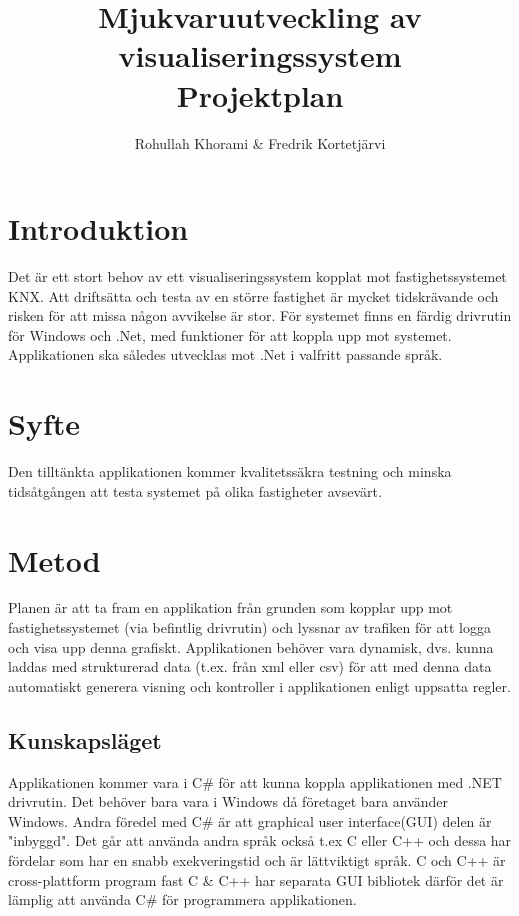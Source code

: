 \documentclass{article}
\title{Mjukvaruutveckling av visualiseringssystem\\
\Large {Projektplan}
}
\author{Rohullah Khorami \& Fredrik Kortetjärvi }
\begin{document}
\maketitle
\newpage
\tableofcontents
\newpage

\section{Introduktion}Det är ett stort behov av ett visualiseringssystem kopplat mot fastighetssystemet KNX. Att driftsätta och testa av
en större fastighet är mycket tidskrävande och risken för att missa någon avvikelse är stor. 
För systemet finns en färdig drivrutin för Windows och .Net, med funktioner för att koppla upp mot systemet.
Applikationen ska således utvecklas mot .Net i valfritt passande språk.

\section{Syfte}Den tilltänkta applikationen kommer kvalitetssäkra testning och minska tidsåtgången att testa systemet på olika fastigheter avsevärt.

\section{Metod}
Planen är att ta fram en applikation från grunden som kopplar upp mot
fastighetssystemet (via befintlig drivrutin) och lyssnar av trafiken för att logga och visa upp denna grafiskt.
Applikationen behöver vara dynamisk, dvs. kunna laddas med strukturerad data (t.ex. från xml eller csv) för att
med denna data automatiskt generera visning och kontroller i applikationen enligt uppsatta regler.\newline

\subsection{Kunskapsläget}
Applikationen kommer vara i C\# för att kunna koppla applikationen med .NET drivrutin. Det behöver bara vara i Windows då företaget bara använder Windows. Andra föredel med C\# är att graphical user interface(GUI) delen är "inbyggd". Det går att använda andra språk också t.ex C eller C++ och dessa har fördelar som har en snabb exekveringstid och är lättviktigt språk. C och C++ är cross-plattform program fast C \& C++ har separata GUI bibliotek därför det är lämplig att använda C\# för programmera applikationen.\newline 
\end{document}
